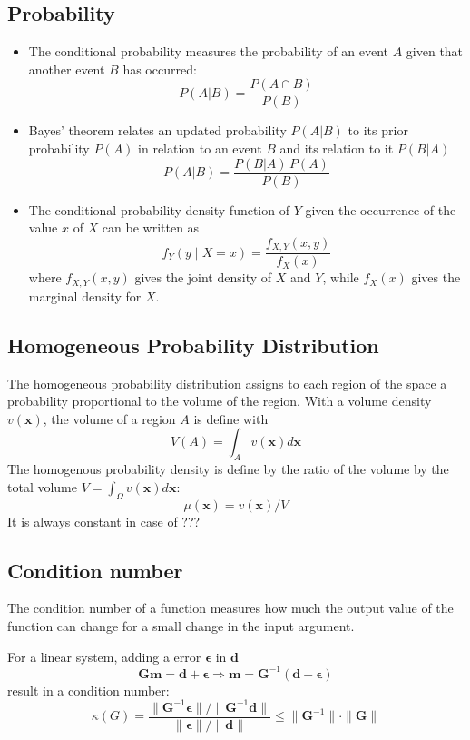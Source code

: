 \documentclass[twocolumn]{article}
\numberwithin{equation}{section}
\begin{document}
	\subsection{Probability}
\begin{itemize}
\item The conditional probability measures the probability of an event $A$ given that another event $B$ has occurred:
$$P(A|B) = \frac{P(A \cap B)}{P(B)}$$
	\item Bayes' theorem relates an updated probability $P(A|B)$ to its prior probability $P(A)$ in relation to an event $B$ and its relation to it $P(B | A)$
$$P(A|B) = \frac{P(B | A)\, P(A)}{P(B)}$$
	\item The conditional probability density function of $Y$ given the occurrence of the value $x$ of $X$ can be written as
$$f_Y(y \mid X=x) = \frac{f_{X, Y}(x, y)}{f_X(x)}$$
where $f_{X,Y}(x, y)$ gives the joint density of $X$ and $Y$, while $f_X(x)$ gives the marginal density for $X$.
\end{itemize}

	\subsection{Homogeneous Probability Distribution}
The homogeneous probability distribution assigns to each region of the space a probability proportional to the volume of the region. With a volume density $v(\mathbf{x})$, the volume of a region $A$ is define with 
$$V(A)=\int_A v(\mathbf{x}) d\mathbf{x}$$
The homogenous probability density is define by the ratio of the volume by the total volume $V=\int_\Omega v(\mathbf{x}) d\mathbf{x}$:
$$\mu (\mathbf{x})=v(\mathbf{x})/V$$
It is always constant in case of ???

	\subsection{Condition number} \label{subsec:Condition_number}
The condition number of a function measures how much the output value of the function can change for a small change in the input argument.

For a linear system, adding a error $\mathbf{\epsilon}$ in $\mathbf{d}$ 
$$\mathbf{G}\mathbf{m} =\mathbf{d} + \mathbf{\epsilon} \Rightarrow \mathbf{m}= \mathbf{G}^{-1}(\mathbf{d} + \mathbf{\epsilon}) $$
result in a condition number:
$$ \kappa(G) = \frac{ \| \mathbf{G}^{-1} \mathbf{\epsilon} \| / \| \mathbf{G}^{-1} \mathbf{d} \| }{ \| \mathbf{\epsilon} \| / \| \mathbf{d} \| } \le \| \mathbf{G}^{-1} \| \cdot \| \mathbf{G} \| $$
\end{document}

